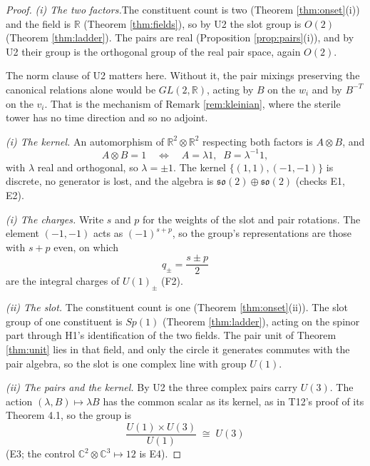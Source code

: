 \documentclass[11pt]{article}
\theoremstyle{definition}
\newcommand{\R}{\mathbb{R}}
\newcommand{\C}{\mathbb{C}}
\newcommand{\so}{\mathfrak{so}}
\newcommand{\pstep}[1]{\par\smallskip\noindent\textit{#1.}\enspace}
\begin{document}
\begin{proof}
\textit{(i) The two factors.}\enspace The constituent count is two (Theorem \ref{thm:onset}(i)) and the field is $\R$ (Theorem \ref{thm:fields}), so by U2 the slot group is $O(2)$ (Theorem \ref{thm:ladder}). The pairs are real (Proposition \ref{prop:pairs}(i)), and by U2 their group is the orthogonal group of the real pair space, again $O(2)$.

The norm clause of U2 matters here. Without it, the pair mixings preserving the canonical relations alone would be $GL(2,\R)$, acting by $B$ on the $w_{i}$ and by $B^{-T}$ on the $v_{i}$. That is the mechanism of Remark \ref{rem:kleinian}, where the sterile tower has no time direction and so no adjoint.

\pstep{(i) The kernel} An automorphism of $\R^{2} \otimes \R^{2}$ respecting both factors is $A \otimes B$, and
\[
A \otimes B = 1 \quad\Longleftrightarrow\quad A = \lambda 1, \;\; B = \lambda^{-1}1,
\]
with $\lambda$ real and orthogonal, so $\lambda = \pm 1$. The kernel $\{(1,1), (-1,-1)\}$ is discrete, no generator is lost, and the algebra is $\so(2) \oplus \so(2)$ (checks E1, E2).

\pstep{(i) The charges} Write $s$ and $p$ for the weights of the slot and pair rotations. The element $(-1, -1)$ acts as $(-1)^{s + p}$, so the group's representations are those with $s + p$ even, on which
\[
q_{\pm} = \frac{s \pm p}{2}
\]
are the integral charges of $U(1)_{\pm}$ (F2).

\pstep{(ii) The slot} The constituent count is one (Theorem \ref{thm:onset}(ii)). The slot group of one constituent is $Sp(1)$ (Theorem \ref{thm:ladder}), acting on the spinor part through H1's identification of the two fields. The pair unit of Theorem \ref{thm:unit} lies in that field, and only the circle it generates commutes with the pair algebra, so the slot is one complex line with group $U(1)$.

\pstep{(ii) The pairs and the kernel} By U2 the three complex pairs carry $U(3)$. The action $(\lambda, B) \mapsto \lambda B$ has the common scalar as its kernel, as in T12's proof of its Theorem 4.1, so the group is
\[
\frac{U(1) \times U(3)}{U(1)} \;\cong\; U(3)
\]
(E3; the control $\C^{2} \otimes \C^{3} \mapsto 12$ is E4).
\end{proof}
\end{document}
